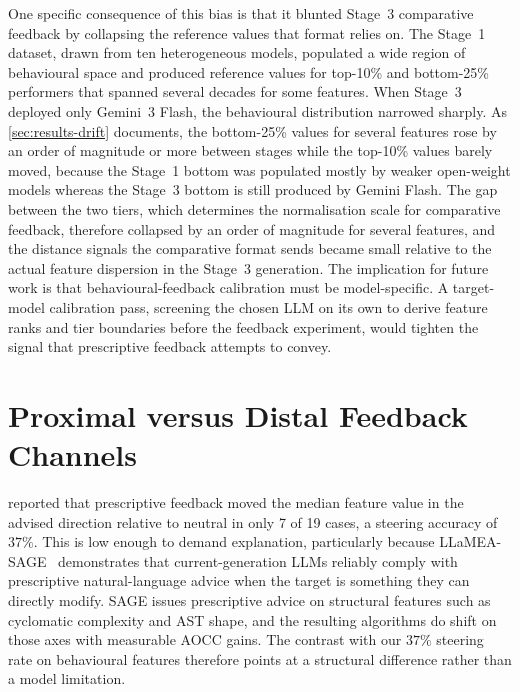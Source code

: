 One specific consequence of this bias is that it blunted Stage~3 comparative feedback by collapsing the reference values that format relies on. The Stage~1 dataset, drawn from ten heterogeneous models, populated a wide region of behavioural space and produced reference values for top-10\% and bottom-25\% performers that spanned several decades for some features. When Stage~3 deployed only Gemini~3 Flash, the behavioural distribution narrowed sharply. As \cref{sec:results-drift} documents, the bottom-25\% values for several features rose by an order of magnitude or more between stages while the top-10\% values barely moved, because the Stage~1 bottom was populated mostly by weaker open-weight models whereas the Stage~3 bottom is still produced by Gemini Flash. The gap between the two tiers, which determines the normalisation scale for comparative feedback, therefore collapsed by an order of magnitude for several features, and the distance signals the comparative format sends became small relative to the actual feature dispersion in the Stage~3 generation. The implication for future work is that behavioural-feedback calibration must be model-specific. A target-model calibration pass, screening the chosen LLM on its own to derive feature ranks and tier boundaries before the feedback experiment, would tighten the signal that prescriptive feedback attempts to convey.

\section{Proximal versus Distal Feedback Channels}
\label{sec:discussion-channel}

 reported that prescriptive feedback moved the median feature value in the advised direction relative to neutral in only 7 of 19 cases, a steering accuracy of $37\%$. This is low enough to demand explanation, particularly because LLaMEA-SAGE~\cite{vanStein2026LLaMEASAGE} demonstrates that current-generation LLMs reliably comply with prescriptive natural-language advice when the target is something they can directly modify. SAGE issues prescriptive advice on structural features such as cyclomatic complexity and AST shape, and the resulting algorithms do shift on those axes with measurable AOCC gains. The contrast with our $37\%$ steering rate on behavioural features therefore points at a structural difference rather than a model limitation.

